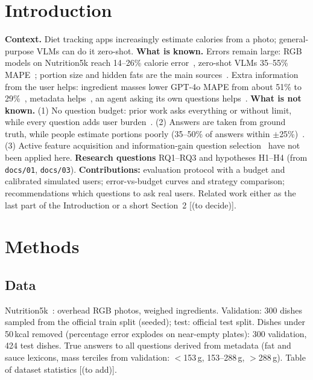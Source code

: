 \documentclass[twocolumn]{svjour3}
\newcommand{\plan}[1]{{\color{blue!70!black}#1}}   %
\newcommand{\open}[1]{\textcolor{red!70!black}{[#1]}} %
\begin{document}
\section{Introduction}
\label{sec:intro}
\plan{
\textbf{Context.} Diet tracking apps increasingly estimate calories from a photo; general-purpose VLMs
can do it zero-shot. \textbf{What is known.} Errors remain large: RGB models on Nutrition5k reach
14--26\% calorie error~\cite{thames2021nutrition5k,han2023dpf}, zero-shot VLMs 35--55\%
MAPE~\cite{fridolfsson2025llm,bhatambarekar2025thesis}; portion size and hidden fats are the main
sources~\cite{lo2020review,vinod2026portion,nutrients2026prompt}. Extra information from the user helps:
ingredient masses lower GPT-4o MAPE from about 51\% to 29\%~\cite{bhatambarekar2025thesis}, metadata
helps~\cite{coburn2025lmm}, an agent asking its own questions helps~\cite{bhatambarekar2026agentic}.
\textbf{What is not known.} (1) No question budget: prior work asks everything or without limit, while
every question adds user burden~\cite{hochsmann2020review}. (2) Answers are taken from ground truth,
while people estimate portions poorly (35--50\% of answers within $\pm$25\%)~\cite{lucassen2021portion}.
(3) Active feature acquisition and information-gain question selection~\cite{aronsson2025afa,kobalczyk2025active}
have not been applied here. \textbf{Research questions} RQ1--RQ3 and hypotheses H1--H4 (from
\texttt{docs/01}, \texttt{docs/03}). \textbf{Contributions:} evaluation protocol with a budget and
calibrated simulated users; error-vs-budget curves and strategy comparison; recommendations which
questions to ask real users. Related work either as the last part of the Introduction or a short
Section~2 \open{(to decide)}.
}

\section{Methods}
\label{sec:methods}

\subsection{Data}
\plan{Nutrition5k~\cite{thames2021nutrition5k}: overhead RGB photos, weighed ingredients. Validation:
300 dishes sampled from the official train split (seeded); test: official test split. Dishes under
50\,kcal removed (percentage error explodes on near-empty plates): 300 validation, 424 test dishes.
True answers to all questions derived from metadata (fat and sauce lexicons, mass terciles from
validation: $<$153\,g, 153--288\,g, $>$288\,g). Table of dataset statistics \open{(to add)}.}
\end{document}
